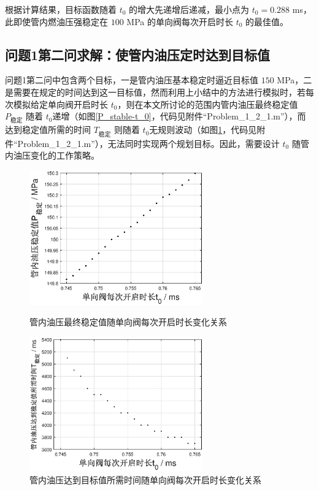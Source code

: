 \documentclass[12pt,a4paper]{article}
\begin{document}
根据计算结果，目标函数随着 $t_0$ 的增大先递增后递减，最小点为 $t_0=0.288$ ms，此即使管内燃油压强稳定在 $100$ MPa 的单向阀每次开启时长 $t_0$ 的最佳值。

\subsection{问题1第二问求解：使管内油压定时达到目标值}
问题1第二问中包含两个目标，一是管内油压基本稳定时逼近目标值 $150$ MPa，二是需要在规定的时间达到这一目标值，然而利用上小结中的方法进行模拟时，若每次模拟给定单向阀开启时长 $t_0$，则在本文所讨论的范围内管内油压最终稳定值 $P_{\text{稳定}}$ 随着 $t_0$递增（如图\ref{P_stable-t_0}，代码见附件“Problem\_1\_2\_1.m”），而达到稳定值所需的时间 $T_{\text{稳定}}$ 则随着 $t_0$无规则波动（如图\ref{T_stable-t_0}，代码见附件“Problem\_1\_2\_1.m”），无法同时实现两个规划目标。因此，需要设计 $t_0$ 随管内油压变化的工作策略。
\begin{figure}[htbp]
\centering
\begin{minipage}[t]{0.48\textwidth}
\centering
\includegraphics[width=7.5cm]{Problem_1_2_P_stable-t_0.eps}
\caption{管内油压最终稳定值随单向阀每次开启时长变化关系}\label{P_stable-t_0}
\end{minipage}
\begin{minipage}[t]{0.48\textwidth}
\centering
\includegraphics[width=7.5cm]{Problem_1_2_T_stable-t_0.eps}
\caption{管内油压达到目标值所需时间随单向阀每次开启时长变化关系}\label{T_stable-t_0}
\end{minipage}
\end{figure}
\end{document}
